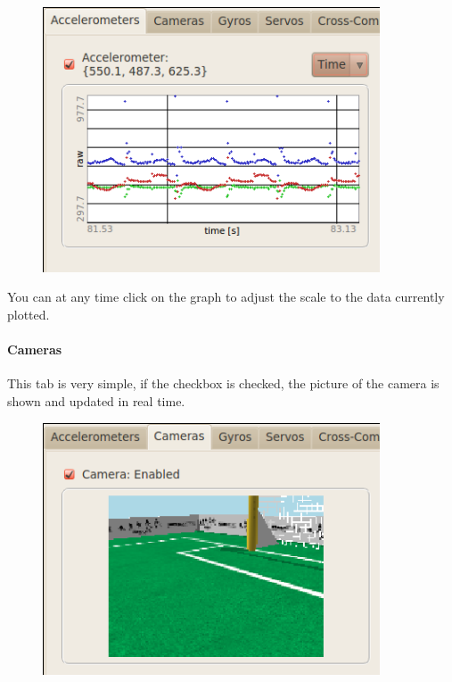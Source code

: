 \documentclass[a4paper, 12pt]{article}  		%
\begin{document}
\begin{figure}[H]
\begin{center}
\includegraphics[width=10cm]{window_accel.png}
\label{window_accel}
\end{center}
\end{figure}

You can at any time click on the graph to adjust the scale to the data currently plotted.\\

\newpage
\paragraph*{Cameras}
This tab is very simple, if the checkbox is checked, the picture of the camera is shown and updated in real time.\\

\begin{figure}[H]
\begin{center}
\includegraphics[width=10cm]{window_camera.png}
\label{window_camera}
\end{center}
\end{figure}
\end{document}
